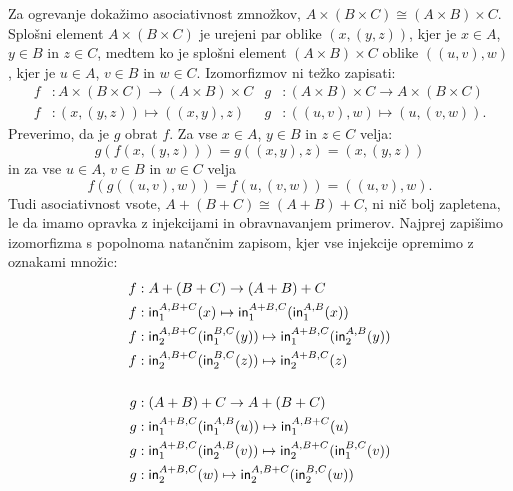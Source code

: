 Za ogrevanje dokažimo asociativnost zmnožkov,
$A \times (B \times C) \cong (A \times B) \times C$. Splošni element
$A \times (B \times C)$ je urejeni par oblike $(x, (y, z))$, kjer je $x \in A$, $y \in B$
in $z \in C$, medtem ko je splošni element $(A \times B) \times C$ oblike $((u, v), w)$,
kjer je $u \in A$, $v \in B$ in $w \in C$. Izomorfizmov ni težko zapisati:
%
\begin{align*}
  f &:  A \times (B \times C) \to (A \times B) \times C &
  g &: (A \times B) \times C \to A \times (B \times C) \\
  f &: (x, (y, z)) \mapsto ((x, y), z) &
  g &: ((u, v), w) \mapsto (u, (v, w)).
\end{align*}
%
Preverimo, da je $g$ obrat $f$. Za vse $x \in A$, $y \in B$ in $z \in C$ velja:
%
\begin{equation*}
  g(f(x, (y, z))) = g((x, y), z) = (x, (y, z))
\end{equation*}
%
in za vse $u \in A$, $v \in B$ in $w \in C$ velja
%
\begin{equation*}
  f(g((u, v), w)) = f(u, (v, w)) = ((u, v), w).
\end{equation*}
%
Tudi asociativnost vsote, $A + (B + C) \cong (A + B) + C$, ni nič bolj zapletena, le da
imamo opravka z injekcijami in obravnavanjem primerov. Najprej zapišimo izomorfizma s
popolnoma natančnim zapisom, kjer vse injekcije opremimo z oznakami množic:
%
\begin{align*}
  f &:  A + (B + C) \to (A + B) + C \\
  f &: \inl[A][B+C](x)             \mapsto \inl[A+B][C](\inl[A][B](x)) \\
  f &: \inr[A][B+C](\inl[B][C](y)) \mapsto \inl[A+B][C](\inr[A][B](y)) \\
  f &: \inr[A][B+C](\inr[B][C](z)) \mapsto \inr[A+B][C](z) \\[\baselineskip]
  g &: (A + B) + C \to A + (B + C) \\
  g &: \inl[A+B][C](\inl[A][B](u)) \mapsto \inl[A][B+C](u)\\
  g &: \inl[A+B][C](\inr[A][B](v)) \mapsto \inr[A][B+C](\inl[B][C](v))  \\
  g &: \inr[A+B][C](w)              \mapsto \inr[A][B+C](\inr[B][C](w))
\end{align*}
